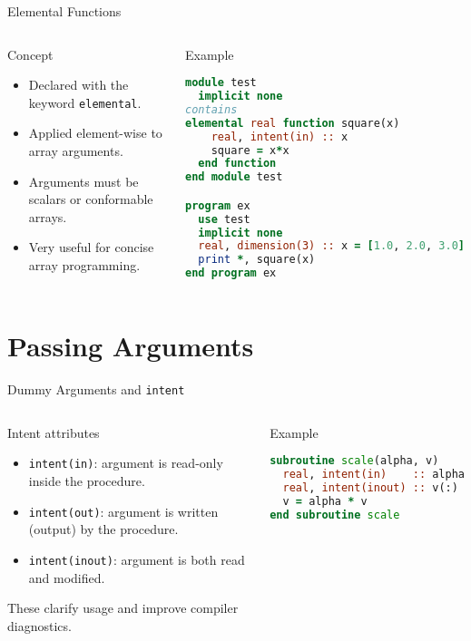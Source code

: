 \begin{frame}[fragile]{Elemental Functions}
  \begin{columns}[T]
    \begin{block}{Concept}
      \begin{itemize}
        \item Declared with the keyword \texttt{elemental}.
        \item Applied element-wise to array arguments.
        \item Arguments must be scalars or conformable arrays.
        \item Very useful for concise array programming.
      \end{itemize}
    \end{block}

    \begin{block}{Example}
\begin{lstlisting}[language=Fortran]
module test
  implicit none
contains
elemental real function square(x)
    real, intent(in) :: x
    square = x*x
  end function
end module test

program ex
  use test
  implicit none
  real, dimension(3) :: x = [1.0, 2.0, 3.0]
  print *, square(x)
end program ex
\end{lstlisting}

    \end{block}
  \end{columns}
\end{frame}


\section{Passing Arguments}

\begin{frame}[fragile]{Dummy Arguments and \texttt{intent}}
  \begin{columns}[T]
    \begin{block}{Intent attributes}
      \begin{itemize}
        \item \texttt{intent(in)}: argument is read-only inside the procedure.
        \item \texttt{intent(out)}: argument is written (output) by the procedure.
        \item \texttt{intent(inout)}: argument is both read and modified.
      \end{itemize}
      These clarify usage and improve compiler diagnostics.
    \end{block}

    \begin{block}{Example}
\begin{lstlisting}[language=Fortran]
subroutine scale(alpha, v)
  real, intent(in)    :: alpha
  real, intent(inout) :: v(:)
  v = alpha * v
end subroutine scale
\end{lstlisting}
    \end{block}
  \end{columns}
\end{frame}


